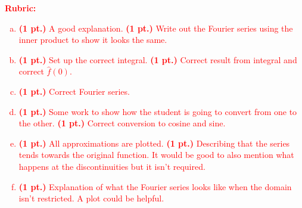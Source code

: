 \documentclass[12pt]{article} %
\begin{document}
\vspace*{1cm}
\textcolor{red}{
\noindent \textbf{Rubric:}
\begin{enumerate}[(a)]
    \item \textbf{(1 pt.)} A good explanation. \textbf{(1 pt.)} Write out the Fourier series using the inner product to show it looks the same.
	\item \textbf{(1 pt.)} Set up the correct integral. \textbf{(1 pt.)} Correct result from integral and correct $\hat{f}(0)$.
	\item \textbf{(1 pt.)} Correct Fourier series.
	\item \textbf{(1 pt.)} Some work to show how the student is going to convert from one to the other. \textbf{(1 pt.)} Correct conversion to cosine and sine. 
	\item \textbf{(1 pt.)} All approximations are plotted. \textbf{(1 pt.)} Describing that the series tends towards the original function. It would be good to also mention what happens at the discontinuities but it isn't required.
	\item \textbf{(1 pt.)} Explanation of what the Fourier series looks like when the domain isn't restricted. A plot could be helpful.
\end{enumerate}
}
\end{document}
